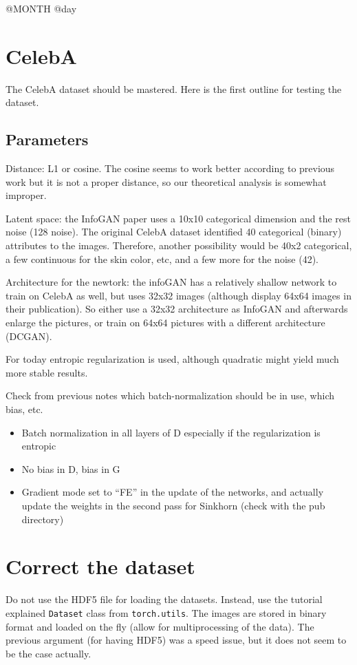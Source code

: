 \documentclass[11pt,a4paper]{article}
\begin{document}

{\Huge @MONTH @day}

\section{CelebA}

The CelebA dataset should be mastered. Here is the first outline for testing the dataset.

\subsection{Parameters}

Distance: L1 or cosine. The cosine seems to work better according to previous work but it is not a proper distance, so our theoretical analysis is somewhat improper.

Latent space: the InfoGAN paper uses a 10x10 categorical dimension and the rest noise (128 noise). The original CelebA dataset identified 40 categorical (binary) attributes to the images. Therefore, another possibility would be 40x2 categorical, a few continuous for the skin color, etc, and a few more for the noise (42).

Architecture for the newtork: the infoGAN has a relatively shallow network to train on CelebA as well, but uses 32x32 images (although display 64x64 images in their publication). So either use a 32x32 architecture as InfoGAN and afterwards enlarge the pictures, or train on 64x64 pictures with a different architecture (DCGAN).

For today entropic regularization is used, although quadratic might yield much more stable results.

Check from previous notes which batch-normalization should be in use, which bias, etc.

\begin{itemize}

    \item
        Batch normalization in all layers of D especially if the regularization is entropic
    \item
        No bias in D, bias in G
    \item
        Gradient mode set to ``{FE}'' in the update of the networks, and
        actually update the weights in the second pass for Sinkhorn (check with the pub directory)
\end{itemize}

\section{Correct the dataset}

Do not use the HDF5 file for loading the datasets. Instead, use the tutorial
explained \texttt{Dataset} class from \texttt{torch.utils}. The images are
stored in binary format and loaded on the fly (allow for multiprocessing of the
data). The previous argument (for having HDF5) was a speed issue, but it does
not seem to be the case actually.

\printbibliography{}
\end{document}
